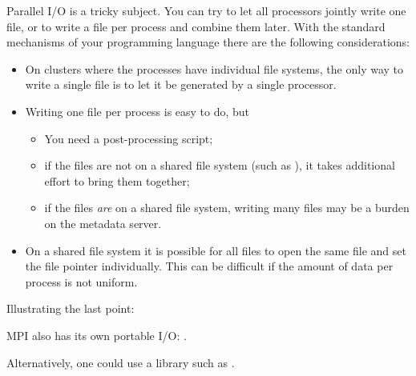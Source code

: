 
Parallel I/O is a tricky subject. You can try to let all processors
jointly write one file, or to write a file per process and combine
them later. With the standard mechanisms of your programming language
there are the following considerations:
\begin{itemize}
\item On clusters where the processes have individual file systems,
  the only way to write a single file is to let it be generated by a
  single processor.
\item Writing one file per process is easy to do, but
  \begin{itemize}
  \item You need a post-processing script;
  \item if the files are not on a shared file system (such as
    ), it takes additional effort to bring them
    together;
  \item if the files \emph{are} on a shared file system, writing many
    files may be a burden on the metadata server.
  \end{itemize}
\item On a shared file system it is possible for all files to open the
  same file and set the file pointer individually. This can be
  difficult if the amount of data per process is not uniform.
\end{itemize}
Illustrating the last point:
%

MPI also has its own portable I/O: .

Alternatively, one could use a library such as .
